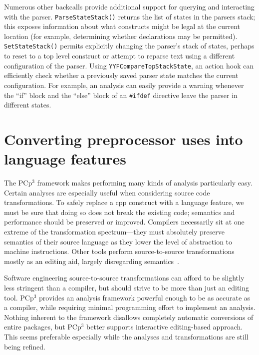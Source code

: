 \documentclass{article}
\newcommand{\pcp}{\mbox{\textsf{PCp}$^3$}}
\newcommand{\Cpp}{\mbox{\textsf{cpp}}}
\newcommand{\ppd}[1]{\texttt{\##1}}
\begin{document}
Numerous other backcalls provide additional support for querying and
interacting with the parser.  \texttt{ParseStateStack()} returns the
list of states in the parsers stack; this exposes information about
what constructs might be legal at the current location (for example, determining whether
declarations may be permitted).  \texttt{SetStateStack()} permits
explicitly changing the parser's stack of states, perhaps to reset to a
top level construct or attempt to reparse text using a different configuration
of the parser.  Using \texttt{YYFCompareTopStackState}, an action hook
can efficiently check whether a previously saved parser state
matches the current configuration.  For example, an analysis can easily
provide a warning whenever the ``if'' block and the ``else''
block of an \ppd{ifdef} directive leave the parser in different states.





\section{Converting preprocessor uses into language features}
\label{sec:xform}

The \pcp{} framework makes performing many kinds of analysis
particularly easy.  Certain analyses are especially useful when
considering source code transformations.  To safely replace a \Cpp{}
construct with a language feature, we must be sure that doing so does
not break the existing code;  semantics and performance should be
preserved or improved.  Compilers necessarily sit at one extreme of the
transformation spectrum---they must absolutely preserve semantics of
their source language as they lower the level of abstraction to machine
instructions.  Other tools perform source-to-source transformations
mostly as an editing aid, largely disregarding semantics~\cite{C2J,C2JPP}.

Software engineering source-to-source transformations can afford to be
slightly less stringent than a compiler, but should strive to be more
than just an editing tool.  \pcp{} provides an analysis framework
powerful enough to be as accurate as a compiler, while requiring minimal
programming effort to implement an analysis.  Nothing inherent to the
framework disallows completely automatic conversions of entire packages,
but \pcp{} better supports interactive editing-based approach.  This
seems preferable especially while the analyses and transformations are
still being refined.
\end{document}
